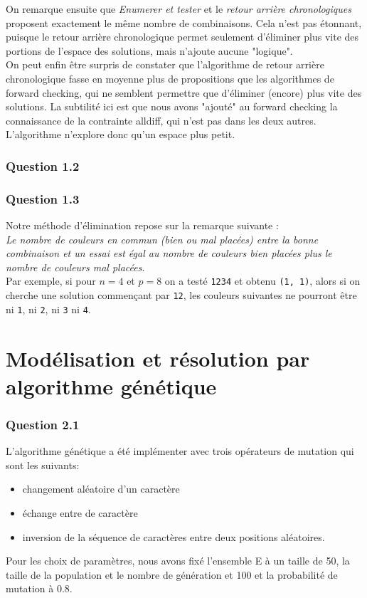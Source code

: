 \documentclass[a4paper, 12pt]{report}
\newcommand{\py}[1]{\texttt{#1}}
\begin{document}
On remarque ensuite que \textit{Enumerer et tester} et le \textit{retour arrière chronologiques} proposent exactement le même nombre de combinaisons. Cela n'est pas étonnant, puisque le retour arrière chronologique permet seulement d'éliminer plus vite des portions de l'espace des solutions, mais n'ajoute aucune "logique". \\

On peut enfin être surpris de constater que l'algorithme de retour arrière chronologique fasse en moyenne plus de propositions que les algorithmes de forward checking, qui ne semblent permettre que d'éliminer (encore) plus vite des solutions. La subtilité ici est que nous avons "ajouté" au forward checking la connaissance de la contrainte alldiff, qui n'est pas dans les deux autres. L'algorithme n'explore donc qu'un espace plus petit.

\section*{Question 1.2}
\section*{Question 1.3}

Notre méthode d'élimination repose sur la remarque suivante : \\

\textit{Le nombre de couleurs en commun (bien ou mal placées) entre la bonne combinaison et un essai est égal au nombre de couleurs bien placées plus le nombre de couleurs mal placées}. \\

Par exemple, si pour $n = 4$ et $p = 8$ on a testé \py{1234} et obtenu \py{(1, 1)}, alors si on cherche une solution commençant par \py{12}, les couleurs suivantes ne pourront être ni \py{1}, ni \py{2}, ni \py{3} ni \py{4}.

\part*{Modélisation et résolution par algorithme génétique}

\section*{Question 2.1}
L'algorithme génétique a été implémenter avec trois opérateurs de mutation qui sont les suivants:
\begin{itemize}
	\item changement aléatoire d'un caractère
	\item échange entre de caractère
	\item inversion de la séquence de caractères entre deux positions aléatoires.
\end{itemize}
Pour les choix de paramètres, nous avons fixé l'ensemble E à un taille de 50, la taille de la population et le nombre de génération et 100 et la probabilité de mutation à 0.8.
\end{document}
